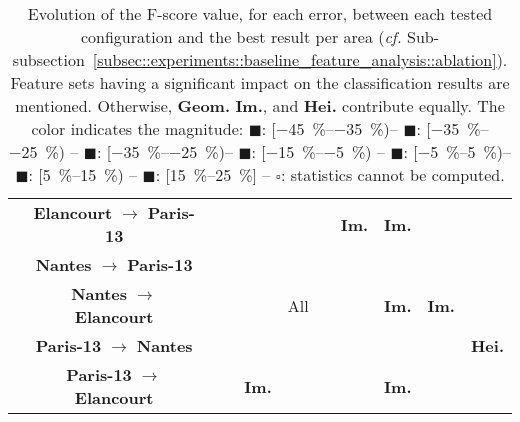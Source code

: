 \begin{table}[htbp]
\begin{tabular}{| c | c | c c c c |c c c c c|}
                & \textbf{Elancourt} \(\rightarrow\) \textbf{Paris-13}  & \cellcolor{LOSS0515}& \cellcolor{LOSS1525}& \cellcolor{STBL}& \cellcolor{LOSS1525}& \cellcolor{STBL}& \cellcolor{GAIN0515}\textbf{Im.}& \cellcolor{GAIN0515}\textbf{Im.}& \cellcolor{LOSS0515}&\cellcolor{STBL}\\
                & \textbf{Nantes} \(\rightarrow\) \textbf{Paris-13}  & \cellcolor{LOSS0515}& \cellcolor{LOSS1525}& & \cellcolor{GAIN1525}& \cellcolor{STBL}& \cellcolor{GAIN0515}& \cellcolor{GAIN0515}& &\cellcolor{STBL}\\
                & \textbf{Nantes} \(\rightarrow\) \textbf{Elancourt}  &\cellcolor{GAIN0515} & \cellcolor{LOSS0515}& \cellcolor{LOSS0515}&\cellcolor{GAIN0515}All & \cellcolor{STBL}& \cellcolor{LOSS1525}&\cellcolor{LOSS0515}\textbf{Im.} &\cellcolor{GAIN0515}\textbf{Im.} &\cellcolor{STBL}\\
                & \textbf{Paris-13} \(\rightarrow\) \textbf{Nantes}  &\cellcolor{LOSS1525} & \cellcolor{LOSS0515}& & \cellcolor{GAIN0515}&\cellcolor{STBL} & \cellcolor{LOSS2535}& \cellcolor{STBL}& & \cellcolor{LOSS0515} \textbf{Hei.}\\
                & \textbf{Paris-13} \(\rightarrow\) \textbf{Elancourt}  &\cellcolor{STBL} &\cellcolor{LOSS0515} & \cellcolor{GAIN0515}\textbf{Im.} & \cellcolor{STBL}& \cellcolor{STBL}& \cellcolor{LOSS3545}& \cellcolor{LOSS1525}\textbf{Im.} & & \cellcolor{STBL}\\
                \hline                                            
            \end{tabular}
            \renewcommand{\arraystretch}{1}
            \caption{
                \label{tab::transferability_comparison} Evolution of the F-score value, for each error, between each tested configuration and the best result per area (\textit{cf.} Sub-subsection~\ref{subsec::experiments::baseline_feature_analysis::ablation}).
                Feature sets having a significant impact on the classification results are mentioned.
                Otherwise, \textbf{Geom.} \textbf{Im.}, and \textbf{Hei.} contribute equally.
                The color indicates the magnitude: \textcolor{LOSS3545}{$\blacksquare$}: [\SIrange[range-phrase={, }]{-45}{-35}{\percent})--
                \textcolor{LOSS2535}{$\blacksquare$}: [\SIrange[range-phrase={, }]{-35}{-25}{\percent}) --
                \textcolor{LOSS1525}{$\blacksquare$}: [\SIrange[range-phrase={, }]{-35}{-25}{\percent})--
                \textcolor{LOSS0515}{$\blacksquare$}: [\SIrange[range-phrase={, }]{-15}{-5}{\percent}) --
                \textcolor{STBL}{$\blacksquare$}: [\SIrange[range-phrase={, }]{-5}{5}{\percent})--
                \textcolor{GAIN0515}{$\blacksquare$}: [\SIrange[range-phrase={, }]{5}{15}{\percent}) --
                \textcolor{GAIN1525}{$\blacksquare$}: [\SIrange[range-phrase={, }]{15}{25}{\percent}] --
                $\square$: statistics cannot be computed.
            }
        \end{table}


